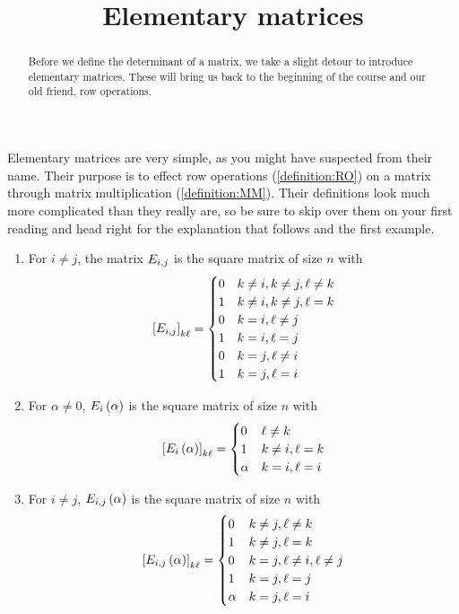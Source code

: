 \documentclass{ximera}
\title{Elementary matrices}
\begin{document}
\begin{abstract}
  Before we define the determinant of a matrix, we take a slight
  detour to introduce elementary matrices.  These will bring us back
  to the beginning of the course and our old friend, row operations.
\end{abstract}
\maketitle

Elementary matrices are very simple, as you might have suspected from
their name.  Their purpose is to effect row operations
(\ref{definition:RO}) on a matrix through matrix multiplication
(\ref{definition:MM}).  Their definitions look much more complicated
than they really are, so be sure to skip over them on your first
reading and head right for the explanation that follows and the first
example.



\begin{definition}

\begin{enumerate}\item For $i\neq j$, the matrix $E_{i,j}$ is the square matrix of size $n$ with
\[
\left\lbrack E_{i,j}\right\rbrack_{k\ell}=
\begin{cases}
0 & k\neq i, k\neq j, \ell\neq k\\
1 & k\neq i, k\neq j, \ell=k\\
0 & k=i, \ell\neq j\\
1 & k=i, \ell=j\\
0 & k=j, \ell\neq i\\
1 & k=j, \ell=i
\end{cases}
\]
\item For $\alpha\neq 0$, $E_{i}\left(\alpha\right)$ is the square matrix of size $n$ with
\[
\left\lbrack E_{i}\left(\alpha\right)\right\rbrack_{k\ell}=
\begin{cases}
0        & \ell\neq k\\
1        & k\neq i, \ell=k\\
\alpha & k=i, \ell=i
\end{cases}
\]
\item For $i\neq j$, $E_{i,j}\left(\alpha\right)$ is the square matrix of size $n$ with
\[
\left\lbrack E_{i,j}\left(\alpha\right)\right\rbrack_{k\ell}=
\begin{cases}
0 & k\neq j, \ell\neq k\\
1 & k\neq j, \ell=k\\
0 & k=j, \ell\neq i, \ell\neq j\\
1 & k=j, \ell=j\\
\alpha & k=j, \ell=i\\
\end{cases}
\]
\end{enumerate}
\end{definition}
\end{document}
